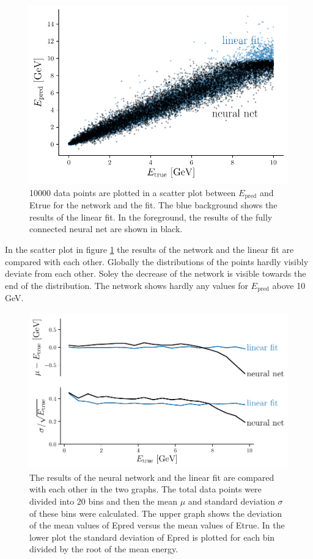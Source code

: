 \documentclass[12pt, a4paper]{thesis}
\begin{document}
\begin{figure}[H]
  \centering
  \includegraphics[width=.9\linewidth]{../images/dense_scatter.pdf}
  \caption{ 10000 data points are plotted in a scatter plot between
    \(E_\text{pred}\) and Etrue for the network and the fit. The blue
    background shows the results of the linear fit. In the foreground,
    the results of the fully connected neural net are shown in black.}
  \label{dense_scatter}
\end{figure} 

In the scatter plot in figure \ref{dense_scatter} the results of the
network and the linear fit are compared with each other. Globally the
distributions of the points hardly visibly deviate from each
other. Soley the decrease of the network is visible towards the end of
the distribution.  The network shows hardly any values for
\(E_{\text{pred}}\) above 10 GeV.

\begin{figure}[H]
  \centering
  \includegraphics[width=.9\linewidth]{../images/dense_res.pdf}
  \caption{ The results of the neural network and the linear fit are
    compared with each other in the two graphs. The total data points
    were divided into 20 bins and then the mean \(\mu\) and standard
    deviation \(\sigma\) of these bins were calculated. The upper graph
    shows the deviation of the mean values of Epred versus the mean
    values of Etrue. In the lower plot the standard deviation of Epred
    is plotted for each bin divided by the root of the mean
    energy. }
  \label{dense_res}
\end{figure} 
\end{document}
